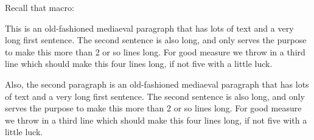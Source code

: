 \begin{answer}
Recall that macro:

\begin{examplewithcode}

\begin{minipage}[t]{3in}
\def\biginitial#1{\hskip-20pt \Hang{\huge #1}\hskip 20pt}
\parindent=0pt

\everypar{\hangafter=-2 \hangindent=20pt \biginitial}
This is an old-fashioned mediaeval paragraph that has lots of text and
a very long first sentence. The second sentence is also long, and only
serves the purpose to make this more than 2 or so lines long. For good
measure we throw in a third line which should make this four lines
long, if not five with a little luck.

Also, the second paragraph is an old-fashioned mediaeval paragraph that
has lots of text and a very long first sentence. The second sentence
is also long, and only serves the purpose to make this more than 2 or
so lines long. For good measure we throw in a third line which should
make this four lines long, if not five with a little luck.
\end{minipage}
\end{examplewithcode}
\end{answer}

\endinput

\begin{594exercise}
\end{594exercise}

\begin{594exercise}
\end{594exercise}

\begin{594exercise}
\end{594exercise}

\begin{594exercise}
\end{594exercise}

